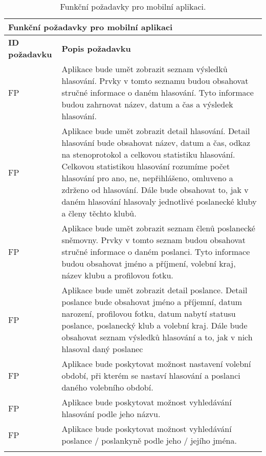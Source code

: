 \def\arraystretch{1.5}
\begin{longtable}{|l|p{9cm}|} \hline
	\multicolumn{2}{|l|}{\textbf{Funkční požadavky pro mobilní aplikaci}} \\ \hline
	
	\textbf{ID požadavku} & \textbf{Popis požadavku} \\ \hline
	
	FP\textunderscore01	& Aplikace bude umět zobrazit seznam výsledků hlasování. Prvky v tomto seznamu budou obsahovat stručné informace o daném hlasování. Tyto informace budou zahrnovat název, datum a čas a výsledek hlasování. \\ \hline
	
	FP\textunderscore02	& Aplikace bude umět zobrazit detail hlasování. Detail hlasování bude obsahovat název, datum a čas, odkaz na stenoprotokol a celkovou statistiku hlasování. Celkovou statistikou hlasování rozumíme počet hlasování pro ano, ne, nepřihlášeno, omluveno a zdrženo od hlasování. Dále bude obsahovat to, jak v daném hlasování hlasovaly jednotlivé poslanecké kluby a členy těchto klubů. \\ \hline
	
	FP\textunderscore03	& Aplikace bude umět zobrazit seznam členů poslanecké sněmovny. Prvky v tomto seznam budou obsahovat stručné informace o daném poslanci. Tyto informace budou obsahovat jméno a příjmení, volební kraj, název klubu a profilovou fotku. \\ \hline
	
	FP\textunderscore04	& Aplikace bude umět zobrazit detail poslance. Detail poslance bude obsahovat jméno a příjemní, datum narození, profilovou fotku, datum nabytí statusu poslance, poslanecký klub a volební kraj. Dále bude obsahovat seznam výsledků hlasování a to, jak v nich hlasoval daný poslanec\\ \hline
	
	FP\textunderscore05	& Aplikace bude poskytovat možnost nastavení volební období, při kterém se nastaví hlasování a poslanci daného volebního období.\\ \hline
	
	FP\textunderscore06	& Aplikace bude poskytovat možnost vyhledávání hlasování podle jeho názvu.\\ \hline
	
	FP\textunderscore07	& Aplikace bude poskytovat možnost vyhledávání poslance / poslankyně podle jeho / jejího jména.\\ \hline
	
	\caption{Funkční požadavky pro mobilní aplikaci.}
	\label{table:func_req_app}
\end{longtable}



